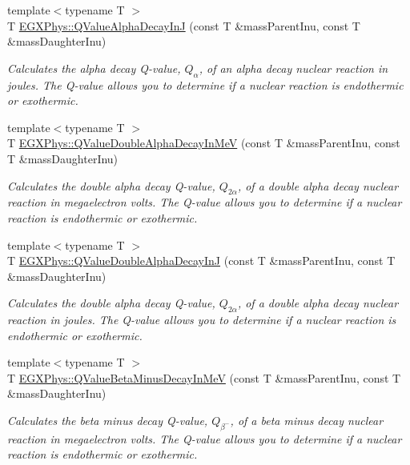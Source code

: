\begin{DoxyCompactItemize}
{\footnotesize template$<$typename T $>$ }\\T \hyperlink{group___q_value_ga3e767be294dae24e1df18e7ccb8989e6}{E\+G\+X\+Phys\+::\+Q\+Value\+Alpha\+Decay\+InJ} (const T \&mass\+Parent\+Inu, const T \&mass\+Daughter\+Inu)
\begin{DoxyCompactList}\small\item\em Calculates the alpha decay Q-\/value, $Q_{\alpha}$, of an alpha decay nuclear reaction in joules. The Q-\/value allows you to determine if a nuclear reaction is endothermic or exothermic. \end{DoxyCompactList}\item 
{\footnotesize template$<$typename T $>$ }\\T \hyperlink{group___q_value_ga9bc6e8f493ee3769eb6eea0ac7cbdc61}{E\+G\+X\+Phys\+::\+Q\+Value\+Double\+Alpha\+Decay\+In\+MeV} (const T \&mass\+Parent\+Inu, const T \&mass\+Daughter\+Inu)
\begin{DoxyCompactList}\small\item\em Calculates the double alpha decay Q-\/value, $Q_{2\alpha}$, of a double alpha decay nuclear reaction in megaelectron volts. The Q-\/value allows you to determine if a nuclear reaction is endothermic or exothermic. \end{DoxyCompactList}\item 
{\footnotesize template$<$typename T $>$ }\\T \hyperlink{group___q_value_gaefd0ecd4ae3166d18a4748ff540e6bfc}{E\+G\+X\+Phys\+::\+Q\+Value\+Double\+Alpha\+Decay\+InJ} (const T \&mass\+Parent\+Inu, const T \&mass\+Daughter\+Inu)
\begin{DoxyCompactList}\small\item\em Calculates the double alpha decay Q-\/value, $Q_{2\alpha}$, of a double alpha decay nuclear reaction in joules. The Q-\/value allows you to determine if a nuclear reaction is endothermic or exothermic. \end{DoxyCompactList}\item 
{\footnotesize template$<$typename T $>$ }\\T \hyperlink{group___q_value_ga42468e998cf58a027a676755aa1339ba}{E\+G\+X\+Phys\+::\+Q\+Value\+Beta\+Minus\+Decay\+In\+MeV} (const T \&mass\+Parent\+Inu, const T \&mass\+Daughter\+Inu)
\begin{DoxyCompactList}\small\item\em Calculates the beta minus decay Q-\/value, $Q_{\beta^-}$, of a beta minus decay nuclear reaction in megaelectron volts. The Q-\/value allows you to determine if a nuclear reaction is endothermic or exothermic. \end{DoxyCompactList}\item 

\end{DoxyCompactItemize}
